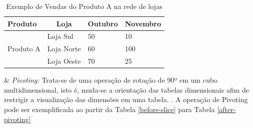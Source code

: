 \begin{table}[ht]
\centering
\begin{tabular}{|c|l|l|l|}
\hline
\multicolumn{1}{|l|}{Produto} & \multicolumn{1}{|c|}{Loja} & Outubro & Novembro \\ \hline
\multirow{3}{*}{Produto A}    & Loja Sul                   & 50      & 10       \\ \cline{2-4} 
\multicolumn{1}{|l|}{}        & Loja Norte                 & 60      & 100      \\ \cline{2-4} 
\multicolumn{1}{|l|}{}        & Loja Oeste                 & 70      & 25       \\ \hline
\end{tabular}
\caption{Exemplo de Vendas do Produto A na rede de lojas}
\label{after-slice}
\end{table}


\begin{easylist}[itemize]

& \textit{Pivoting:} Trata-se de uma operação de rotação de 90º em um cubo multidimensional, isto é, muda-se a orientação das tabelas dimensionais afim de restrigir a visualização das dimensões em uma tabela. \cite{andre2000}. A operação de Pivoting pode ser exemplificada ao partir da Tabela \ref{before-slice} para Tabela \ref{after-pivoting}


\end{easylist}




